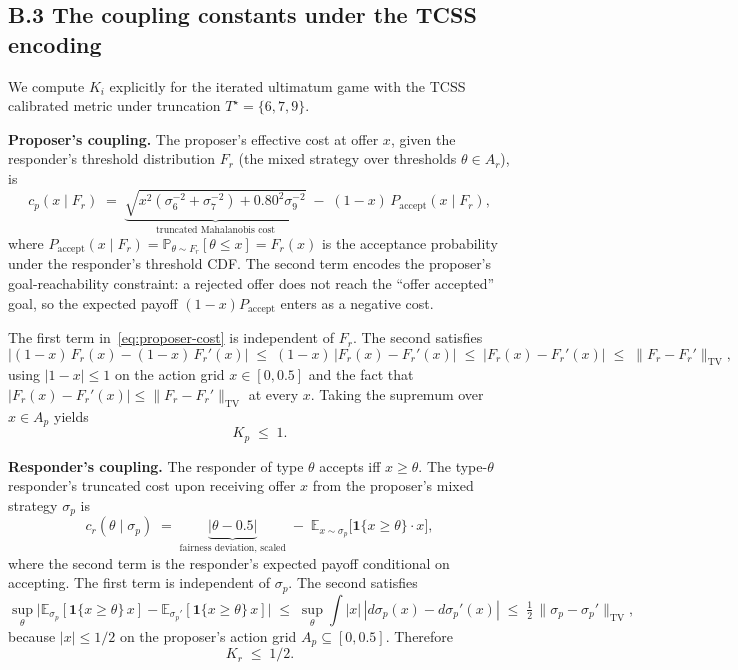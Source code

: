 \documentclass[11pt]{article}
\theoremstyle{definition}
\theoremstyle{remark}
\begin{document}
\subsection*{B.3 The coupling constants under the TCSS encoding}

We compute $K_i$ explicitly for the iterated ultimatum game with the TCSS calibrated metric
under truncation $T^\star = \{6, 7, 9\}$.

\textbf{Proposer's coupling.} The proposer's effective cost at offer $x$, given the responder's
threshold distribution $F_r$ (the mixed strategy over thresholds $\theta \in A_r$), is
\begin{equation}
\label{eq:proposer-cost}
c_p(x \mid F_r) \;=\; \underbrace{\sqrt{x^2 (\sigma_6^{-2} + \sigma_7^{-2}) + 0.80^2 \sigma_9^{-2}}}_{\text{truncated Mahalanobis cost}}
\;-\; (1-x)\, P_{\text{accept}}(x \mid F_r),
\end{equation}
where $P_{\text{accept}}(x \mid F_r) = \mathbb{P}_{\theta \sim F_r}[\theta \leq x] = F_r(x)$ is the
acceptance probability under the responder's threshold CDF. The second term encodes the proposer's
goal-reachability constraint: a rejected offer does not reach the ``offer accepted'' goal, so the
expected payoff $(1-x) P_{\text{accept}}$ enters as a negative cost.

The first term in~\eqref{eq:proposer-cost} is independent of $F_r$. The second satisfies
\[
\bigl| (1-x)\, F_r(x) - (1-x)\, F_r'(x) \bigr|
\;\leq\; (1-x)\, |F_r(x) - F_r'(x)|
\;\leq\; |F_r(x) - F_r'(x)|
\;\leq\; \bigl\| F_r - F_r' \bigr\|_{\mathrm{TV}},
\]
using $|1-x| \leq 1$ on the action grid $x \in [0, 0.5]$ and the fact that $|F_r(x) - F_r'(x)|
\leq \|F_r - F_r'\|_{\mathrm{TV}}$ at every $x$. Taking the supremum over $x \in A_p$ yields
\[
K_p \;\leq\; 1.
\]

\textbf{Responder's coupling.} The responder of type $\theta$ accepts iff $x \geq \theta$. The
type-$\theta$ responder's truncated cost upon receiving offer $x$ from the proposer's mixed
strategy $\sigma_p$ is
\begin{equation}
\label{eq:responder-cost}
c_r(\theta \mid \sigma_p) \;=\; \underbrace{|\theta - 0.5|}_{\text{fairness deviation, scaled}}
\;-\; \mathbb{E}_{x \sim \sigma_p}\bigl[\mathbf{1}\{x \geq \theta\} \cdot x\bigr],
\end{equation}
where the second term is the responder's expected payoff conditional on accepting. The first term
is independent of $\sigma_p$. The second satisfies
\[
\sup_\theta \bigl| \mathbb{E}_{\sigma_p}[\mathbf{1}\{x \geq \theta\}\,x] - \mathbb{E}_{\sigma_p'}[\mathbf{1}\{x \geq \theta\}\,x] \bigr|
\;\leq\; \sup_\theta \int |x|\, |d\sigma_p(x) - d\sigma_p'(x)|
\;\leq\; \tfrac{1}{2}\, \|\sigma_p - \sigma_p'\|_{\mathrm{TV}},
\]
because $|x| \leq 1/2$ on the proposer's action grid $A_p \subseteq [0, 0.5]$. Therefore
\[
K_r \;\leq\; 1/2.
\]
\end{document}
